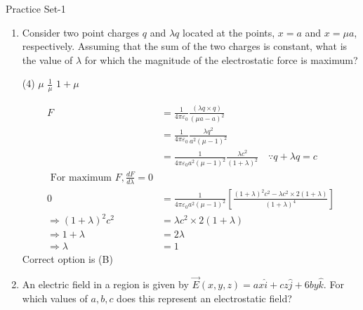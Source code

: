 \newpage
\begin{abox}
	Practice Set-1
\end{abox}
\begin{enumerate}[label=\color{ocre}\textbf{\arabic*.}]
	\item Consider two point charges $q$ and $\lambda q$ located at the points, $x=a$ and $x=\mu a$,
	respectively. Assuming that the sum of the two charges is constant, what is the value of
	$\lambda$ for which the magnitude of the electrostatic force is maximum?
	{}
	\begin{tasks}(4)
		\task[\textbf{A.}]  $\mu$
		\task[\textbf{C.}]$\frac{1}{\mu}$
		\task[\textbf{D.}] $1+\mu$
	\end{tasks}
	\begin{answer}
		\begin{align*}
		F&=\frac{1}{4 \pi \varepsilon_{0}} \frac{(\lambda q \times q)}{(\mu a-a)^{2}}\\&=\frac{1}{4 \pi \varepsilon_{0}} \frac{\lambda q^{2}}{a^{2}(\mu-1)^{2}}\\&=\frac{1}{4 \pi \varepsilon_{0} a^{2}(\mu-1)^{2}} \frac{\lambda c^{2}}{(1+\lambda)^{2}} \quad \because q+\lambda q=c \\
		\text { For maximum } F, \frac{d F}{d \lambda}=0 \\0&= \frac{1}{4 \pi \varepsilon_{0} a^{2}(\mu-1)^{2}}\left[\frac{(1+\lambda)^{2} c^{2}-\lambda c^{2} \times 2(1+\lambda)}{(1+\lambda)^{4}}\right] \\
		\Rightarrow(1+\lambda)^{2} c^{2}&=\lambda c^{2} \times 2(1+\lambda)\\ \Rightarrow 1+\lambda&=2 \lambda \\\Rightarrow \lambda&=1
		\end{align*}
		Correct option is (B)
	\end{answer}
\item  An electric field in a region is given by $\vec{E}(x, y, z)=a x \hat{i}+c z \hat{j}+6 b y \hat{k} .$ For which values of
$a, b, c$ does this represent an electrostatic field?
{}


\end{enumerate}
